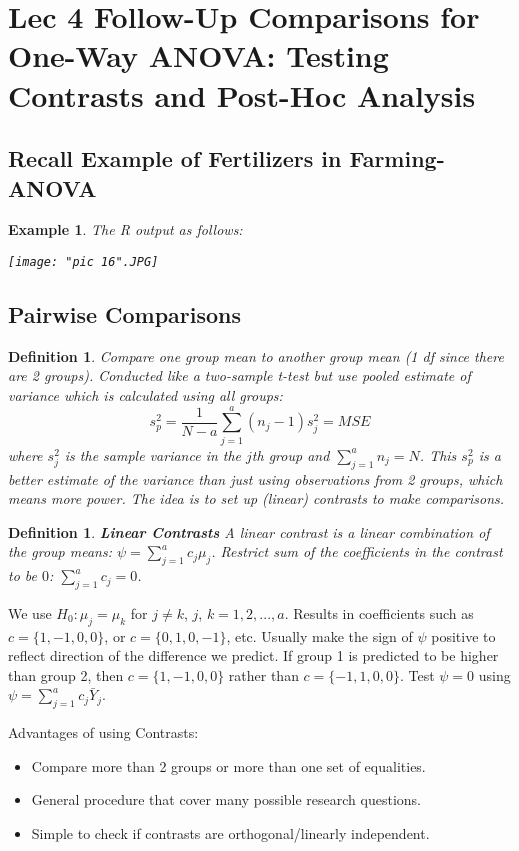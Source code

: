 \documentclass[a4paper,11pt]{article}
\newtheorem{defn}[thm]{Definition}
\newtheorem{eg}[thm]{Example}
\begin{document}
\section{Lec 4 Follow-Up Comparisons for One-Way ANOVA: Testing Contrasts and Post-Hoc Analysis}
\subsection{Recall Example of Fertilizers in Farming- ANOVA}
\begin{eg}
\normalfont
The R output as follows: 

\begin{center}
	\texttt{[image: "pic 16".JPG]}
\end{center}
\end{eg}

\subsection{Pairwise Comparisons}
\begin{defn}
\normalfont
Compare one group mean to another group mean (1 df since there are 2 groups). Conducted like a two-sample t-test but use pooled estimate of variance which is calculated using all groups:
$$s_p^2=\frac{1}{N-a}\sum_{j=1}^a(n_j-1)s_j^2=MSE$$
where $s_j^2$ is the sample variance in the $j$th group and $\sum_{j=1}^an_j=N$. This $s_p^2$ is a better estimate of the variance than just using observations from 2 groups, which means more power. The idea is to set up (linear) contrasts to make comparisons. 
\end{defn}

\begin{defn}
\normalfont
\textbf{Linear Contrasts}
A linear contrast is a linear combination of the group means: $\psi=\sum_{j=1}^ac_j\mu_j$. Restrict sum of the coefficients in the contrast to be $0$: $\sum_{j=1}^ac_j=0$. 
\end{defn}
We use $H_0: \mu_j=\mu_k$ for $j\neq k$, $j$, $k=1,2,...,a$. Results in coefficients such as $c=\{1,-1,0,0\}$, or $c=\{0,1,0,-1\}$, etc. Usually make the sign of $\psi$ positive to reflect direction of the difference we predict. If group 1 is predicted to be higher than group 2, then $c=\{1,-1,0,0\}$ rather than $c=\{-1,1,0,0\}$. Test $\psi=0$ using $\psi=\sum_{j=1}^ac_j\bar{Y}_j$. 

Advantages of using Contrasts:
\begin{itemize}
\item Compare more than 2 groups or more than one set of equalities. 
\item General procedure that cover many possible research questions. 
\item Simple to check if contrasts are orthogonal/linearly independent. 
\end{itemize}
\end{document}

